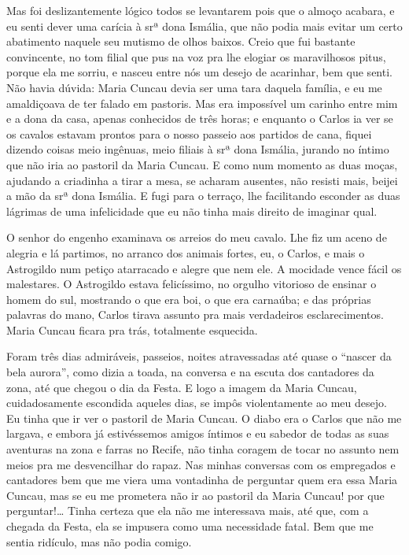\begin{linenumbers}
Mas foi deslizantemente lógico todos se levantarem pois que o almoço
acabara, e eu senti dever uma carícia à srª dona Ismália, que não podia
mais evitar um certo abatimento naquele seu mutismo de olhos baixos.
Creio que fui bastante convincente, no tom filial que pus na voz pra lhe
elogiar os maravilhosos pitus, porque ela me sorriu, e nasceu entre nós
um desejo de acarinhar, bem que senti. Não havia dúvida: Maria Cuncau
devia ser uma tara daquela família, e eu me amaldiçoava de ter falado em
pastoris. Mas era impossível um carinho entre mim e a dona da casa,
apenas conhecidos de três horas; e enquanto o Carlos ia ver se os
cavalos estavam prontos para o nosso passeio aos partidos de cana,
fiquei dizendo coisas meio ingênuas, meio filiais à srª dona Ismália,
jurando no íntimo que não iria ao pastoril da Maria Cuncau. E como num
momento as duas moças, ajudando a criadinha a tirar a mesa, se acharam
ausentes, não resisti mais, beijei a mão da srª dona Ismália. E fugi
para o terraço, lhe facilitando esconder as duas lágrimas de uma
infelicidade que eu não tinha mais direito de imaginar qual.

O senhor do engenho examinava os arreios do meu cavalo. Lhe fiz um aceno
de alegria e lá partimos, no arranco dos animais fortes, eu, o Carlos, e
mais o Astrogildo num petiço atarracado e alegre que nem ele. A mocidade
vence fácil os malestares. O Astrogildo estava felicíssimo, no orgulho
vitorioso de ensinar o homem do sul, mostrando o que era boi, o que era
carnaúba; e das próprias palavras do mano, Carlos tirava assunto pra
mais verdadeiros esclarecimentos. Maria Cuncau ficara pra trás,
totalmente esquecida.

Foram três dias admiráveis, passeios, noites atravessadas até quase o
``nascer da bela aurora'', como dizia a toada, na conversa e na escuta
dos cantadores da zona, até que chegou o dia da Festa. E logo a imagem
da Maria Cuncau, cuidadosamente escondida aqueles dias, se impôs
violentamente ao meu desejo. Eu tinha que ir ver o pastoril de Maria
Cuncau. O diabo era o Carlos que não me largava, e embora já
estivéssemos amigos íntimos e eu sabedor de todas as suas aventuras na
zona e farras no Recife, não tinha coragem de tocar no assunto nem meios
pra me desvencilhar do rapaz. Nas minhas conversas com os empregados e
cantadores bem que me viera uma vontadinha de perguntar quem era essa
Maria Cuncau, mas se eu me prometera não ir ao pastoril da Maria Cuncau!
por que perguntar!\ldots{} Tinha certeza que ela não me interessava mais, até
que, com a chegada da Festa, ela se impusera como uma necessidade fatal.
Bem que me sentia ridículo, mas não podia comigo.


\end{linenumbers}
